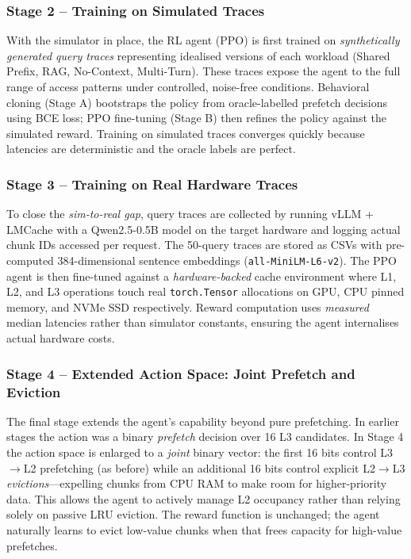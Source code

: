 \documentclass[conference]{IEEEtran}
\begin{document}
\subsubsection{Stage 2 – Training on Simulated Traces}

With the simulator in place, the RL agent (PPO) is first trained on \emph{synthetically generated query traces} representing idealised versions of each workload (Shared Prefix, RAG, No-Context, Multi-Turn). These traces expose the agent to the full range of access patterns under controlled, noise-free conditions. Behavioral cloning (Stage A) bootstraps the policy from oracle-labelled prefetch decisions using BCE loss; PPO fine-tuning (Stage B) then refines the policy against the simulated reward. Training on simulated traces converges quickly because latencies are deterministic and the oracle labels are perfect.

\subsubsection{Stage 3 – Training on Real Hardware Traces}

To close the \emph{sim-to-real gap}, query traces are collected by running vLLM + LMCache with a Qwen2.5-0.5B model on the target hardware and logging actual chunk IDs accessed per request. The 50-query traces are stored as CSVs with pre-computed 384-dimensional sentence embeddings (\texttt{all-MiniLM-L6-v2}). The PPO agent is then fine-tuned against a \emph{hardware-backed} cache environment where L1, L2, and L3 operations touch real \texttt{torch.Tensor} allocations on GPU, CPU pinned memory, and NVMe SSD respectively. Reward computation uses \emph{measured} median latencies rather than simulator constants, ensuring the agent internalises actual hardware costs.

\subsubsection{Stage 4 – Extended Action Space: Joint Prefetch and Eviction}

The final stage extends the agent's capability beyond pure prefetching. In earlier stages the action was a binary \emph{prefetch} decision over 16 L3 candidates. In Stage 4 the action space is enlarged to a \emph{joint} binary vector: the first 16 bits control L3$\rightarrow$L2 prefetching (as before) while an additional 16 bits control explicit L2$\rightarrow$L3 \emph{evictions}---expelling chunks from CPU RAM to make room for higher-priority data. This allows the agent to actively manage L2 occupancy rather than relying solely on passive LRU eviction. The reward function is unchanged; the agent naturally learns to evict low-value chunks when that frees capacity for high-value prefetches.
\end{document}

